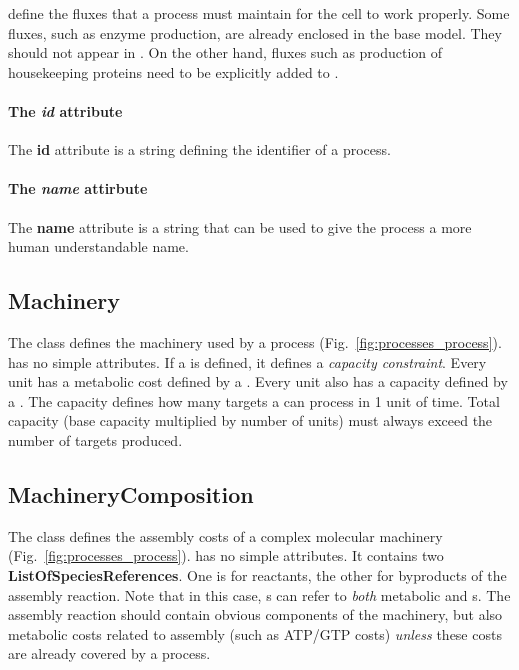 \targets{} define the fluxes that a process must maintain for the cell
to work properly.
Some fluxes, such as enzyme production, are already enclosed in the base model.
They should not appear in \targets{}.
On the other hand, fluxes such as production of housekeeping proteins need
to be explicitly added to \targets{}.

\paragraph{The \textit{id} attribute}
The \textbf{id} attribute is a string defining the identifier of a process.

\paragraph{The \textit{name} attirbute}
The \textbf{name} attribute is a string that can be used to give the process
a more human understandable name.


\subsection{Machinery}
\label{sec:machinery}

The \machinery{} class defines the machinery used by a process
(Fig.~\ref{fig:processes_process}).
\machinery{} has no simple attributes.
If a \machinery{} is defined, it defines a \emph{capacity constraint}.
Every \machinery{} unit has a metabolic cost defined by a \machinerycomposition.
Every unit also has a capacity defined by a \targetvalue.
The capacity defines how many targets a \machinery{} can process in 1 unit of
time.
Total capacity (base capacity multiplied by number of \machinery{} units)
must always exceed the number of targets produced.


\subsection{MachineryComposition}
\label{sec:machinery_composition}

The \machinerycomposition{} class defines the assembly costs of a complex
molecular machinery (Fig.~\ref{fig:processes_process}).
\machinerycomposition{} has no simple attributes.
It contains two \textbf{ListOfSpeciesReferences}.
One is for reactants, the other for byproducts of the assembly reaction.
Note that in this case, \speciesreference{}s can refer to \emph{both}
metabolic \species{} and \macromolecule{}s.
The assembly reaction should contain obvious components of the machinery,
but also metabolic costs related to assembly (such as ATP/GTP costs)
\emph{unless} these costs are already covered by a process.


